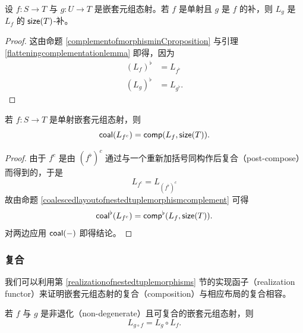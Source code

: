 \begin{proposition}
    设 $f:S \to T$ 与 $g:U \to T$ 是嵌套元组态射。若 $f$ 是单射且 $g$ 是 $f$ 的补，则 $L_{g}$ 是 $L_f$ 的 $\mathsf{size}(T)$-补。
\end{proposition}
\begin{proof}
    这由命题 \ref{complementofmorphisminCproposition} 与引理 \ref{flatteningcomplementationlemma} 即得，因为
    \begin{align*}
    (L_f)^\flat & = L_{f^\flat}\\
    (L_{g})^\flat & = L_{g^\flat}.
    \end{align*}
\end{proof}


\begin{proposition}\label{coalescedlayoutofnestedtuplemorphismcomplement}
    若 $f:S \to T$ 是单射嵌套元组态射，则
    \[
    \mathsf{coal}(L_{f^c}) = \mathsf{comp}(L_f,\mathsf{size}(T)).
    \]
\end{proposition}
\begin{proof} 由于 $f^c$ 是由 $(f^\flat)^c$ 通过与一个重新加括号同构作后复合（post-compose）而得到的，于是
\[
L_{f^c} = L_{(f^\flat)^c}
\]
故由命题 \ref{coalescedlayoutofnestedtuplemorphismcomplement} 可得
\[
\mathsf{coal}^\flat(L_{f^c})  = \mathsf{comp}^\flat(L_f,\mathsf{size}(T)).
\]
对两边应用 $\mathsf{coal}(-)$ 即得结论。
\end{proof}


\subsubsection{复合}

我们可以利用第 \ref{realizationofnestedtuplemorphisms} 节的实现函子（realization functor）来证明嵌套元组态射的复合（composition）与相应布局的复合相容。
\begin{theorem}\label{compatibilityofcompositioninD}
    若 $f$ 与 $g$ 是非退化（non-degenerate）且可复合的嵌套元组态射，则
    \[
    L_{g\circ f} = L_{g} \circ L_{f}.
    \]
\end{theorem}

